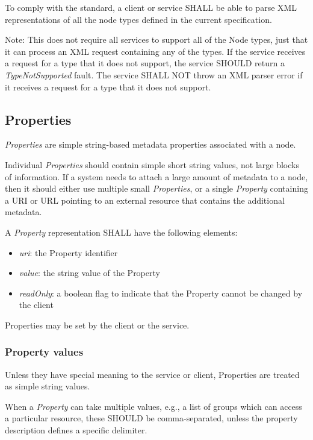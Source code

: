 \documentclass[11pt,a4paper]{ivoa}
\begin{document}
To comply with the standard, a client or service SHALL be able to parse XML representations of all the node types defined in the current specification.

Note: This does not require all services to support all of the Node types, just that it can process an XML request containing any of the types. If the service receives a request for a type that it does not support, the service SHOULD return a \emph{TypeNotSupported} fault. The service SHALL NOT throw an XML parser error if it receives a request for a type that it does not support.

\subsection{Properties}
\label{subsec:properties}
\emph{Properties} are simple string-based metadata properties associated with a node.

Individual \emph{Properties} should contain simple short string values, not large blocks of information. If a system needs to attach a large amount of metadata to a node, then it should either use multiple small \emph{Properties}, or a single \emph{Property} containing a URI or URL pointing to an external resource that contains the additional metadata.

A \emph{Property} representation SHALL have the following elements:

\begin{itemize}
    \item \emph{uri}: the Property identifier
    \item \emph{value}: the string value of the Property
    \item \emph{readOnly}: a boolean flag to indicate that the Property cannot be changed by the client
\end{itemize}

Properties may be set by the client or the service.

\subsubsection{Property values}
\label{subsubsec:property values}
Unless they have special meaning to the service or client, Properties are treated as simple string values.

When a \emph{Property} can take multiple values, e.g., a list of groups which can access a particular resource, these SHOULD be comma-separated, unless the property description defines a specific delimiter.
\end{document}
